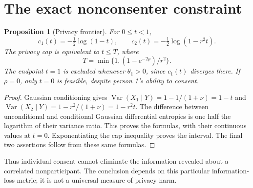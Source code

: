 \documentclass[11pt,a4paper]{article}
\newtheorem{proposition}[theorem]{Proposition}
\theoremstyle{definition}
\theoremstyle{remark}
\DeclareMathOperator{\Var}{Var}
\begin{document}
\section{The exact nonconsenter constraint}
\begin{proposition}[Privacy frontier]
For $0\le t<1$,
\[
 c_1(t)=-\tfrac12\log(1-t),\qquad
 c_2(t)=-\tfrac12\log(1-r^2t).
\]
The privacy cap is equivalent to $t\le T$, where
\[
 T=\min\{1,(1-e^{-2\rho})/r^2\}.
\]
The endpoint $t=1$ is excluded whenever $\theta_1>0$, since $c_1(t)$ diverges there. If $\rho=0$, only $t=0$ is feasible, despite person 1's ability to consent.
\end{proposition}
\begin{proof}
Gaussian conditioning gives
$\Var(X_1\mid Y)=1-1/(1+\nu)=1-t$ and
$\Var(X_2\mid Y)=1-r^2/(1+\nu)=1-r^2t$.
The difference between unconditional and conditional Gaussian differential entropies is one half the logarithm of their variance ratio. This proves the formulas, with their continuous values at $t=0$. Exponentiating the cap inequality proves the interval. The final two assertions follow from these same formulas.
\end{proof}
Thus individual consent cannot eliminate the information revealed about a correlated nonparticipant. The conclusion depends on this particular information-loss metric; it is not a universal measure of privacy harm.
\end{document}
